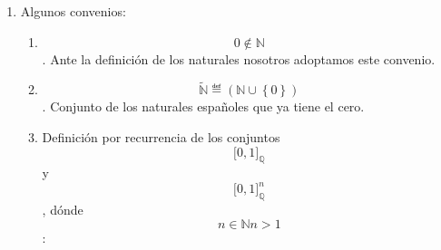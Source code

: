 \begin{enumerate}
\def\labelenumi{\arabic{enumi}.}
\item
  Algunos convenios:

  \begin{enumerate}
  \def\labelenumii{\arabic{enumii}.}
  \item
    \[0 \notin \mathbb{N}\]. Ante la definición de los naturales
    nosotros adoptamos este convenio.
  \item
    \[\widetilde{\mathbb{N}} ≝ \left( {\mathbb{N} \cup \left\{ 0 \right\}} \right)\].
    Conjunto de los naturales españoles que ya tiene el cero.
  \item
    Definición por recurrencia de los conjuntos
    \[\lbrack 0,1\rbrack_{\mathbb{Q}}\]y
    \[\lbrack 0,1\rbrack_{\mathbb{Q}}^{n}\], dónde
    \[{n \in \mathbb{N}}{n > 1}\]:


\end{enumerate}
\end{enumerate}

